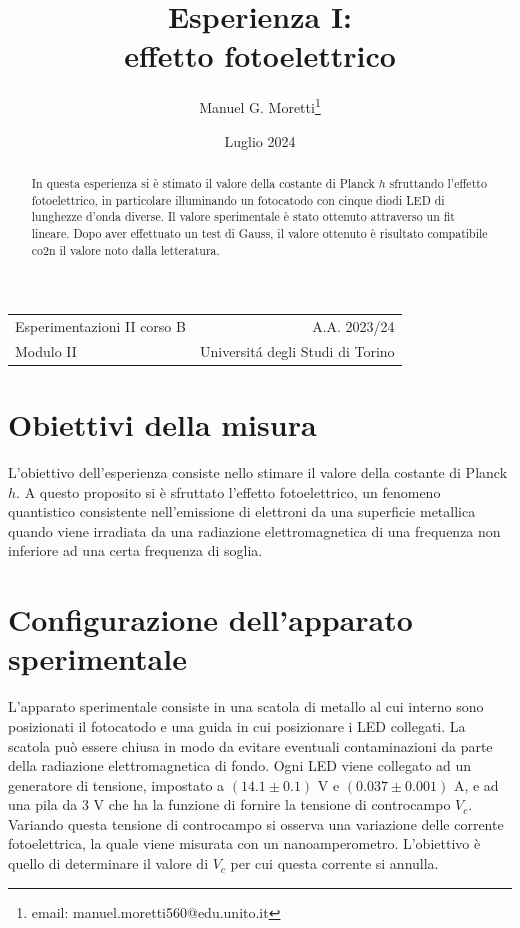 \documentclass{article}
\title{Esperienza I: \\ effetto fotoelettrico}
\author{Manuel G. Moretti\footnote{email: manuel.moretti560@edu.unito.it}}
\date{Luglio 2024}
\begin{document}
\maketitle

\begin{center}
\begin{tabular}{l r}
Esperimentazioni II corso B & A.A. 2023/24 \\
Modulo II & Universit\'{a} degli Studi di Torino \\
\end{tabular}
\end{center}

\begin{abstract}
In questa esperienza si è stimato il valore della costante di Planck $h$ sfruttando l'effetto fotoelettrico, in particolare illuminando un fotocatodo con cinque diodi LED di lunghezze d'onda diverse. Il valore sperimentale è stato ottenuto attraverso un fit lineare. Dopo aver effettuato un test di Gauss, il valore ottenuto è risultato compatibile co2n il valore noto dalla letteratura.
\end{abstract}

\section{Obiettivi della misura}
L'obiettivo dell'esperienza consiste nello stimare il valore della costante di Planck $h$. A questo proposito si è sfruttato l'effetto fotoelettrico, un fenomeno quantistico consistente nell'emissione di elettroni da una superficie metallica quando viene irradiata da una radiazione elettromagnetica di una frequenza non inferiore ad una certa frequenza di soglia.
\section{Configurazione dell'apparato sperimentale}
L'apparato sperimentale consiste in una scatola di metallo al cui interno sono posizionati il fotocatodo e una guida in cui posizionare i LED collegati. La scatola può essere chiusa in modo da evitare eventuali contaminazioni da parte della radiazione elettromagnetica di fondo. Ogni LED viene collegato ad un generatore di tensione, impostato a $(14.1\pm 0.1)$ V e $(0.037\pm0.001)$ A, e ad una pila da 3 V che ha la funzione di fornire la tensione di controcampo $V_c$. Variando questa tensione di controcampo si osserva una variazione delle corrente fotoelettrica, la quale viene misurata con un nanoamperometro. L'obiettivo è quello di determinare il valore di $V_c$ per cui questa corrente si annulla. 
\end{document}

